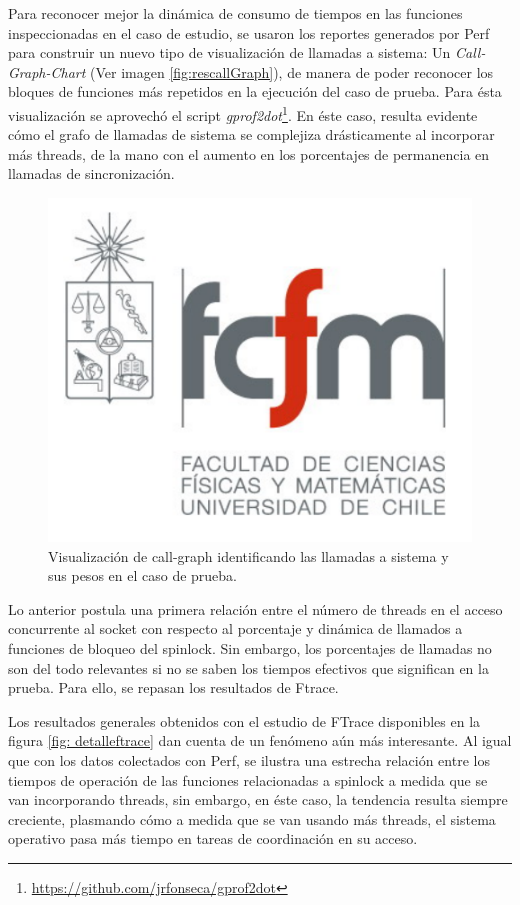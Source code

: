 Para reconocer mejor la dinámica de consumo de tiempos en las funciones inspeccionadas en el caso de estudio, se usaron los reportes generados por Perf para construir un nuevo tipo de visualización de llamadas a sistema: Un \emph{Call-Graph-Chart} (Ver imagen \ref{fig:rescallGraph}), de manera de poder reconocer los bloques de funciones más repetidos en la ejecución del caso de prueba. Para ésta visualización se aprovechó el script \emph{gprof2dot}\footnote{\url{https://github.com/jrfonseca/gprof2dot}}. En éste caso, resulta evidente cómo el grafo de llamadas de sistema se complejiza drásticamente al incorporar más threads, de la mano con el aumento en los porcentajes de permanencia en llamadas de sincronización.
\begin{figure}[!h]
	\centering
	\includegraphics[scale=.5]{imagenes/fcfm}
	\caption{Visualización de call-graph identificando las llamadas a sistema y sus pesos en el caso de prueba.}
	\label{fig:detalleFtrace}
\end{figure}
Lo anterior postula una primera relación entre el número de threads en el acceso concurrente al socket con respecto al porcentaje y dinámica de llamados a funciones de bloqueo del spinlock. Sin embargo, los porcentajes de llamadas no son del todo relevantes si no se saben los tiempos efectivos que significan en la prueba. Para ello, se repasan los resultados de Ftrace.

Los resultados generales obtenidos con el estudio de FTrace disponibles en la figura \ref{fig: detalleftrace} dan cuenta de un fenómeno aún más interesante. Al igual que con los datos colectados con Perf, se ilustra una estrecha relación entre los tiempos de operación de las funciones relacionadas a spinlock a medida que se van incorporando threads, sin embargo, en éste caso, la tendencia resulta siempre creciente, plasmando cómo a medida que se van usando más threads, el sistema operativo pasa más tiempo en tareas de coordinación en su acceso.

